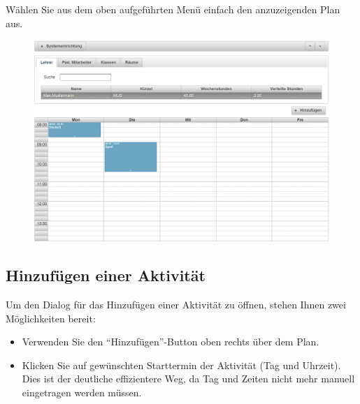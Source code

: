 \documentclass[fontsize=12pt]{scrartcl}
\begin{document}
Wählen Sie aus dem oben aufgeführten Menü einfach den anzuzeigenden Plan aus.
\begin{figure}[H]
\centering
\includegraphics[width=\textwidth]{images/planningPage2.png}
\end{figure}

\subsection{Hinzufügen einer Aktivität}
Um den Dialog für das Hinzufügen einer Aktivität zu öffnen, stehen Ihnen zwei Möglichkeiten bereit: 
\begin{itemize}
\item Verwenden Sie den "`Hinzufügen"'-Button oben rechts über dem Plan.
\item Klicken Sie auf gewünschten Starttermin der Aktivität (Tag und Uhrzeit). Dies ist der deutliche effizientere Weg, da Tag und Zeiten nicht mehr manuell eingetragen werden müssen.
\end{itemize}
\end{document}
